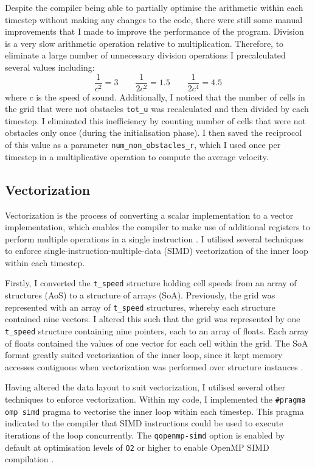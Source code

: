 \documentclass[11pt, twocolumn, a4paper]{article}
\begin{document}
Despite the compiler being able to partially optimise the arithmetic within each timestep without making any changes to the code, there were still some manual improvements that I made to improve the performance of the program.
Division is a very slow arithmetic operation relative to multiplication.
Therefore, to eliminate a large number of unnecessary division operations I precalculated several values including:
\[
    \frac{1}{c^2} = 3\qquad
    \frac{1}{2c^2} = 1.5\qquad
    \frac{1}{2c^4} = 4.5
\]
where $c$ is the speed of sound.
Additionally, I noticed that the number of cells in the grid that were not obstacles \texttt{tot\_u} was recalculated and then divided by each timestep.
I eliminated this inefficiency by counting number of cells that were not obstacles only once (during the initialisation phase).
I then saved the reciprocol of this value as a parameter \texttt{num\_non\_obstacles\_r}, which I used once per timestep in a multiplicative operation to compute the average velocity.

\subsection{Vectorization}

Vectorization is the process of converting a scalar implementation to a vector implementation, which enables the compiler to make use of additional registers to perform multiple operations in a single instruction \cite{vectorization}.
I utilised several techniques to enforce single-instruction-multiple-data (SIMD) vectorization of the inner loop within each timestep.

Firstly, I converted the \texttt{t\_speed} structure holding cell speeds from an array of structures (AoS) to a structure of arrays (SoA).
Previously, the grid was represented with an array of \texttt{t\_speed} structures, whereby each structure contained nine vectors.
I altered this such that the grid was represented by one \texttt{t\_speed} structure containing nine pointers, each to an array of floats.
Each array of floats contained the values of one vector for each cell within the grid.
The SoA format greatly suited vectorization of the inner loop, since it kept memory accesses contiguous when vectorization was performed over structure instances \cite{soa}.

Having altered the data layout to suit vectorization, I utilised several other techniques to enforce vectorization.
Within my code, I implemented the \texttt{\#pragma omp simd} pragma to vectorise the inner loop within each timestep.
This pragma indicated to the compiler that SIMD instructions could be used to execute iterations of the loop concurrently.
The \texttt{qopenmp-simd} option is enabled by default at optimisation levels of \texttt{O2} or higher to enable OpenMP SIMD compilation \cite{icc}.
\end{document}
